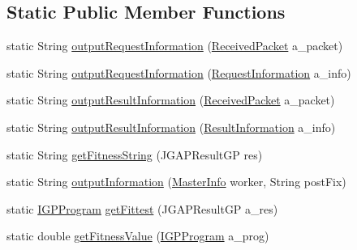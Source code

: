 \subsection*{Static Public Member Functions}
\begin{DoxyCompactItemize}
\item 
static String \hyperlink{classorg_1_1jgap_1_1distr_1_1grid_1_1wan_1_1_w_a_n_utils_aa1079bf67b6a9f6b6db134ada2dfe707}{output\-Request\-Information} (\hyperlink{classorg_1_1jgap_1_1distr_1_1grid_1_1wan_1_1_received_packet}{Received\-Packet} a\-\_\-packet)
\item 
static String \hyperlink{classorg_1_1jgap_1_1distr_1_1grid_1_1wan_1_1_w_a_n_utils_adbf0877136808285579743b06f0122d3}{output\-Request\-Information} (\hyperlink{classorg_1_1jgap_1_1distr_1_1grid_1_1wan_1_1_request_information}{Request\-Information} a\-\_\-info)
\item 
static String \hyperlink{classorg_1_1jgap_1_1distr_1_1grid_1_1wan_1_1_w_a_n_utils_a1eda7e32388b0e22d110ff2b85698576}{output\-Result\-Information} (\hyperlink{classorg_1_1jgap_1_1distr_1_1grid_1_1wan_1_1_received_packet}{Received\-Packet} a\-\_\-packet)
\item 
static String \hyperlink{classorg_1_1jgap_1_1distr_1_1grid_1_1wan_1_1_w_a_n_utils_a0873ab53122c61bebdd63846361f900c}{output\-Result\-Information} (\hyperlink{classorg_1_1jgap_1_1distr_1_1grid_1_1wan_1_1_result_information}{Result\-Information} a\-\_\-info)
\item 
static String \hyperlink{classorg_1_1jgap_1_1distr_1_1grid_1_1wan_1_1_w_a_n_utils_abe85eb32057c55c1b89a56bb31686149}{get\-Fitness\-String} (J\-G\-A\-P\-Result\-G\-P res)
\item 
static String \hyperlink{classorg_1_1jgap_1_1distr_1_1grid_1_1wan_1_1_w_a_n_utils_ac7e3ce8394c09963b007838ae1f27e73}{output\-Information} (\hyperlink{classorg_1_1jgap_1_1distr_1_1_master_info}{Master\-Info} worker, String post\-Fix)
\item 
static \hyperlink{interfaceorg_1_1jgap_1_1gp_1_1_i_g_p_program}{I\-G\-P\-Program} \hyperlink{classorg_1_1jgap_1_1distr_1_1grid_1_1wan_1_1_w_a_n_utils_adabbd9b59a59c5fac76d919765242a4f}{get\-Fittest} (J\-G\-A\-P\-Result\-G\-P a\-\_\-res)
\item 
static double \hyperlink{classorg_1_1jgap_1_1distr_1_1grid_1_1wan_1_1_w_a_n_utils_ab03c59c2e28d651895c49358bccf0629}{get\-Fitness\-Value} (\hyperlink{interfaceorg_1_1jgap_1_1gp_1_1_i_g_p_program}{I\-G\-P\-Program} a\-\_\-prog)
\end{DoxyCompactItemize}

